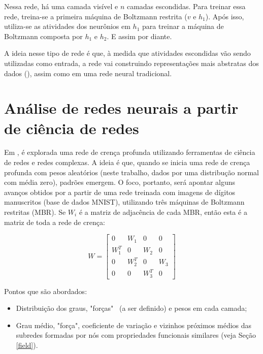 \documentclass{article}
\begin{document}
            Nessa rede, há uma camada visível e $n$ camadas escondidas.
            Para treinar essa rede, treina-se a primeira máquina de Boltzmann restrita ($v$ e $h_1$).
            Após isso, utiliza-se as atividades dos neurônios em $h_1$ para treinar a máquina de Boltzmann composta por $h_1$ e $h_2$.
            E assim por diante.

            A ideia nesse tipo de rede é que, à medida que atividades escondidas vão sendo utilizadas como entrada, a rede vai construindo representações mais abstratas dos dados (\cite{testolin2018deep}), assim como em uma rede neural tradicional.

    \section{Análise de redes neurais a partir de ciência de redes}
        \label{analysis}

        Em \cite{testolin2018deep}, é explorada uma rede de crença profunda utilizando ferramentas de ciência de redes e redes complexas.
        A ideia é que, quando se inicia uma rede de crença profunda com pesos aleatórios (neste trabalho, dados por uma distribução normal com média zero), padrões emergem.
        O foco, portanto, será apontar alguns avanços obtidos por \cite{testolin2018deep} a partir de uma rede treinada com imagens de dígitos manuscritos (base de dados MNIST), utilizando três máquinas de Boltzmann restritas (MBR).
        Se $W_i$ é a matriz de adjacência de cada MBR, então esta é a matriz de toda a rede de crença:

        \begin{equation}
            W = \begin{bmatrix}
                    0 & W_1 & 0 & 0 \\
                    W_1^T & 0 & W_2 & 0 \\
                    0 & W_2^T & 0 & W_3 \\
                    0 & 0 & W_3^T & 0
                \end{bmatrix}
        \end{equation}

        Pontos que são abordados:
        
        \begin{itemize}
            \item Distribuição dos graus, "forças" \ (a ser definido) e pesos em cada camada;
            \item Grau médio, "força", coeficiente de variação e vizinhos próximos médios das subredes formadas por nós com propriedades funcionais similares (veja Seção \ref{field}).
        \end{itemize}
\end{document}
